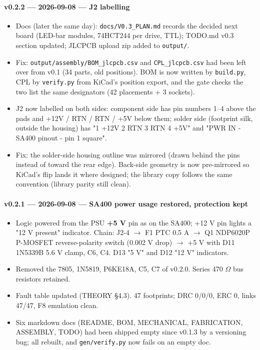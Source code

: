 \documentclass[11pt,a4paper]{article}
\begin{document}
\paragraph{v0.2.2 — 2026-09-08 — J2 labelling}
\begin{itemize}[leftmargin=8mm]
\item Docs (later the same day): \texttt{docs/V0.3\_PLAN.md} records the decided next board (LED-bar modules, 74HCT244 per drive, TTL); TODO.md v0.3 section updated; JLCPCB upload zip added to \texttt{output/}.
\item Fix: \texttt{output/assembly/BOM\_jlcpcb.csv} and \texttt{CPL\_jlcpcb.csv} had been left over from v0.1 (34 parts, old positions). BOM is now written by \texttt{build.py}, CPL by \texttt{verify.py} from KiCad's position export, and the gate checks the two list the same designators (42 placements + 3 sockets).
\item J2 now labelled on both sides: component side has pin numbers 1–4 above the pads and +12V / RTN / RTN / +5V below them; solder side (footprint silk, outside the housing) has "1 +12V 2 RTN 3 RTN 4 +5V" and "PWR IN - SA400 pinout - pin 1 square".
\item Fix: the solder-side housing outline was mirrored (drawn behind the pins instead of toward the rear edge). Back-side geometry is now pre-mirrored so KiCad's flip lands it where designed; the library copy follows the same convention (library parity still clean).
\end{itemize}
\paragraph{v0.2.1 — 2026-09-08 — SA400 power usage restored, protection kept}
\begin{itemize}[leftmargin=8mm]
\item Logic powered from the PSU \textbf{+5 V} pin as on the SA400; +12 V pin lights a "12 V present" indicator. Chain: J2-4 $\to$ F1 PTC 0.5 A $\to$ Q1 NDP6020P P-MOSFET reverse-polarity switch (0.002 V drop) $\to$ +5 V with D11 1N5339B 5.6 V clamp, C6, C4. D13 "5 V" and D12 "12 V" indicators.
\item Removed the 7805, 1N5819, P6KE18A, C5, C7 of v0.2.0. Series 470 $\Omega$ bus resistors retained.
\item Fault table updated (THEORY §4.3). 47 footprints; DRC 0/0/0, ERC 0, links 47/47, F8 emulation clean.
\item Six markdown docs (README, BOM, MECHANICAL, FABRICATION, ASSEMBLY, TODO) had been shipped empty since v0.1.3 by a versioning bug; all rebuilt, and \texttt{gen/verify.py} now fails on an empty doc.
\end{itemize}
\end{document}
